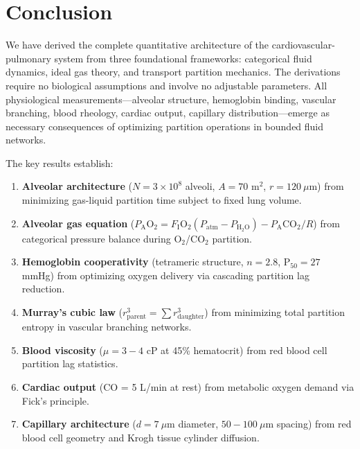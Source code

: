 \documentclass[12pt,a4paper]{article}
\theoremstyle{remark}
\begin{document}
\section{Conclusion}

We have derived the complete quantitative architecture of the cardiovascular-pulmonary system from three foundational frameworks: categorical fluid dynamics, ideal gas theory, and transport partition mechanics. The derivations require no biological assumptions and involve no adjustable parameters. All physiological measurements—alveolar structure, hemoglobin binding, vascular branching, blood rheology, cardiac output, capillary distribution—emerge as necessary consequences of optimizing partition operations in bounded fluid networks.

The key results establish:

\begin{enumerate}
\item \textbf{Alveolar architecture} ($N = 3 \times 10^{8}$ alveoli, $A = 70$ m$^{2}$, $r = 120~\mu$m) from minimizing gas-liquid partition time subject to fixed lung volume.

\item \textbf{Alveolar gas equation} ($P_{\mathrm{A}}\mathrm{O}_{2} = F_{\mathrm{I}}\mathrm{O}_{2}(P_{\mathrm{atm}} - P_{\mathrm{H}_{2}\mathrm{O}}) - P_{\mathrm{A}}\mathrm{CO}_{2}/R$) from categorical pressure balance during O$_{2}$/CO$_{2}$ partition.

\item \textbf{Hemoglobin cooperativity} (tetrameric structure, $n = 2.8$, P$_{50} = 27$ mmHg) from optimizing oxygen delivery via cascading partition lag reduction.

\item \textbf{Murray's cubic law} ($r_{\mathrm{parent}}^{3} = \sum r_{\mathrm{daughter}}^{3}$) from minimizing total partition entropy in vascular branching networks.

\item \textbf{Blood viscosity} ($\mu = 3-4$ cP at 45\% hematocrit) from red blood cell partition lag statistics.

\item \textbf{Cardiac output} (CO = 5 L/min at rest) from metabolic oxygen demand via Fick's principle.

\item \textbf{Capillary architecture} ($d = 7~\mu$m diameter, $50-100~\mu$m spacing) from red blood cell geometry and Krogh tissue cylinder diffusion.
\end{enumerate}
\end{document}
